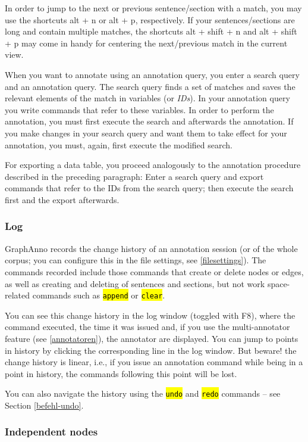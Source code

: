 \documentclass[12pt]{scrartcl}
\newcommand{\code}[1]{\hl{\texttt{#1}}}
\begin{document}
In order to jump to the next or previous sentence/section with a match, you may use the shortcuts alt + n or alt + p, respectively.
If your sentences/sections are long and contain multiple matches, the shortcuts alt + shift + n and alt + shift + p may come in handy for centering the next/previous match in the current view.

When you want to annotate using an annotation query, you enter a search query and an annotation query.
The search query finds a set of matches and saves the relevant elements of the match in variables (or \textit{IDs}).
In your annotation query you write commands that refer to these variables.
In order to perform the annotation, you must first execute the search and afterwards the annotation.
If you make changes in your search query and want them to take effect for your annotation, you must, again, first execute the modified search.

For exporting a data table, you proceed analogously to the annotation procedure described in the preceding paragraph:
Enter a search query and export commands that refer to the IDs from the search query; then execute the search first and the export afterwards.

\subsubsection{Log}\label{window-log}

GraphAnno records the change history of an annotation session (or of the whole corpus; you can configure this in the file settings, see \ref{filesettings}).
The commands recorded include those commands that create or delete nodes or edges, as well as creating and deleting of sentences and sections, but not work space-related commands such as \code{append} or \code{clear}.

You can see this change history in the log window (toggled with F8), where the command executed, the time it was issued and, if you use the multi-annotator feature (see \ref{annotatoren}), the annotator are displayed.
You can jump to points in history by clicking the corresponding line in the log window.
But beware! the change history is linear, i.e., if you issue an annotation command while being in a point in history, the commands following this point will be lost.

You can also navigate the history using the \code{undo} and \code{redo} commands – see Section \ref{befehl-undo}.

\subsubsection{Independent nodes}\label{window-independent}
\end{document}
